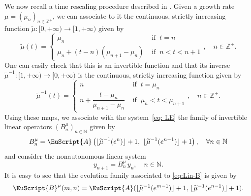 \documentclass[reqno, a4paper, 10pt]{amsart}
\theoremstyle{plain}
\numberwithin{equation}{section}
\theoremstyle{remark}
\def\cA{\EuScript{A}}
\def\cB{\EuScript{B}}
\def\Z{\mathbb{Z}}
\begin{document}
We now recall a time rescaling procedure described in \cite{DS}. Given a growth rate $\mu=(\mu_n)_{n \in \Z^+}$, we can associate to it the continuous, strictly increasing function $\widetilde \mu\colon [0,+\infty) \to [1,+\infty )$ given by
\[
\widetilde \mu(t)=
\begin{cases}
	\mu_n & \text{ if } \ t=n\\
	\mu_n+(t-n)(\mu_{n+1}-\mu_n) & \text{ if } \ n<t<n+1
\end{cases}, \quad n \in \Z^+.
\]
One can easily check that this is an invertible function and that its inverse ${\widetilde \mu}^{-1}\colon [1,+\infty) \to [0,+\infty)$ is the continuous, strictly increasing function given by
\[
\widetilde \mu^{-1}(t)=
\begin{cases}
	n & \text{ if } \ t=\mu_n\\
	n+\dfrac{t-\mu_n}{\mu_{n+1}-\mu_n} & \text{ if } \ \mu_n<t<\mu_{n+1}
\end{cases}, \quad n \in \Z^+.
\]
Using these maps, we associate with the system~\eqref{eq: LE} the family of invertible linear operators $(B^{\mu}_n)_{n \in \mathbb{N}}$ given by 
\begin{equation}\label{eq:B-mu}
B^{\mu}_n=\cA\left(\lfloor \widetilde\mu^{-1}(e^n) \rfloor +1, \  \lfloor \widetilde\mu^{-1}(e^{n-1}) \rfloor +1 \right), \quad \forall n \in \mathbb{N}
\end{equation}
and consider the nonautonomous linear system
\begin{equation}\label{eq:Lin-B}
	y_{n+1}=B^{\mu}_n \, y_n, \quad n \in \mathbb{N}. 
\end{equation}
It is easy to see that the evolution family associated to \eqref{eq:Lin-B} is given by 
\[
\begin{split}
\cB ^{\mu}(m,n)
 =\cA(\lfloor\widetilde\mu^{-1}(e^{m-1})\rfloor +1,\,\lfloor\widetilde\mu^{-1}(e^{n-1})\rfloor +1).
\end{split}
\]
\end{document}
